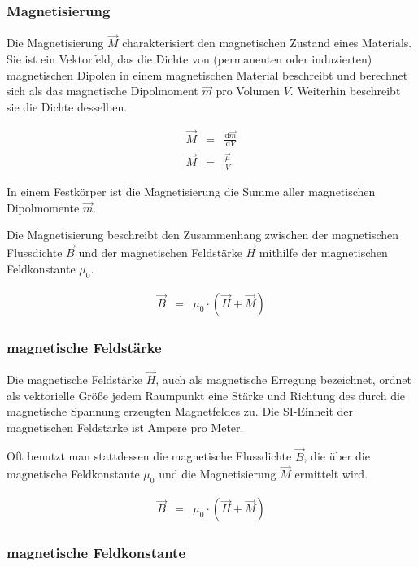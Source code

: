 \documentclass[12pt,a4paper]{scrartcl}
\numberwithin{equation}{section} %
\begin{document}
\hypertarget{magnetisierung}{%
\subsubsection{Magnetisierung}\label{magnetisierung}}

Die Magnetisierung $\vec M$ charakterisiert den magnetischen Zustand
eines Materials. Sie ist ein Vektorfeld, das die Dichte von (permanenten
oder induzierten) magnetischen Dipolen in einem magnetischen Material
beschreibt und berechnet sich als das magnetische Dipolmoment $\vec m$
pro Volumen $V$. Weiterhin beschreibt sie die Dichte desselben.

\begin{eqnarray}
    \vec M &=& \frac{\mathrm d\vec m}{\mathrm dV} \\
    \vec M &=& \frac{\vec \mu}{V}
\end{eqnarray}

In einem Festkörper ist die Magnetisierung die Summe aller magnetischen
Dipolmomente $\vec m$.

Die Magnetisierung beschreibt den Zusammenhang zwischen der magnetischen
Flussdichte $\vec B$ und der magnetischen Feldstärke $\vec H$
mithilfe der magnetischen Feldkonstante $\mu_0$.

\begin{eqnarray}
 \vec B &=& \mu_0 \cdot \left(\vec H + \vec M\right)
\end{eqnarray}

\hypertarget{magnetische-feldstuxe4rke}{%
\subsubsection{magnetische Feldstärke}\label{magnetische-feldstuxe4rke}}

Die magnetische Feldstärke $\vec H$, auch als magnetische Erregung
bezeichnet, ordnet als vektorielle Größe jedem Raumpunkt eine Stärke und
Richtung des durch die magnetische Spannung erzeugten Magnetfeldes zu.
Die SI-Einheit der magnetischen Feldstärke ist Ampere pro Meter.

Oft benutzt man stattdessen die magnetische Flussdichte $\vec B$, die
über die magnetische Feldkonstante $\mu_0$ und die Magnetisierung
$\vec M$ ermittelt wird.

\begin{eqnarray}
    \vec B &=& \mu_0 \cdot \left(\vec H + \vec M\right)
\end{eqnarray}

\hypertarget{magnetische-feldkonstante}{%
\subsubsection{magnetische
Feldkonstante}\label{magnetische-feldkonstante}}
\end{document}
